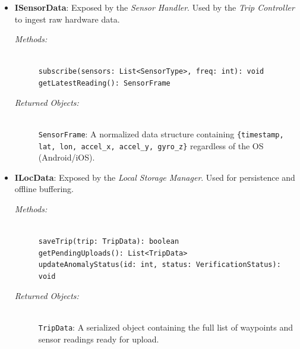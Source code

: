 \begin{itemize}
    \item \begin{minipage}[t]{\linewidth}
        \textbf{ISensorData}: Exposed by the \textit{Sensor Handler}. Used by the \textit{Trip Controller} to ingest raw hardware data.
        \begin{description}
            \item[\textit{Methods:}] \hfill \\
            \texttt{subscribe(sensors: List<SensorType>, freq: int): void} \\
            \texttt{getLatestReading(): SensorFrame}
            \item[\textit{Returned Objects:}] \hfill \\
            \texttt{SensorFrame}: A normalized data structure containing \texttt{\{timestamp, lat, lon, accel\_x, accel\_y, gyro\_z\}} regardless of the OS (Android/iOS).
        \end{description}
    \end{minipage}
    \vspace{0.3cm}

    \item \begin{minipage}[t]{\linewidth}
        \textbf{ILocData}: Exposed by the \textit{Local Storage Manager}. Used for persistence and offline buffering.
        \begin{description}
            \item[\textit{Methods:}] \hfill \\
            \texttt{saveTrip(trip: TripData): boolean} \\
            \texttt{getPendingUploads(): List<TripData>} \\
            \texttt{updateAnomalyStatus(id: int, status: VerificationStatus): void}
            \item[\textit{Returned Objects:}] \hfill \\
            \texttt{TripData}: A serialized object containing the full list of waypoints and sensor readings ready for upload.
        \end{description}
    \end{minipage}
    \vspace{0.3cm}


\end{itemize}
